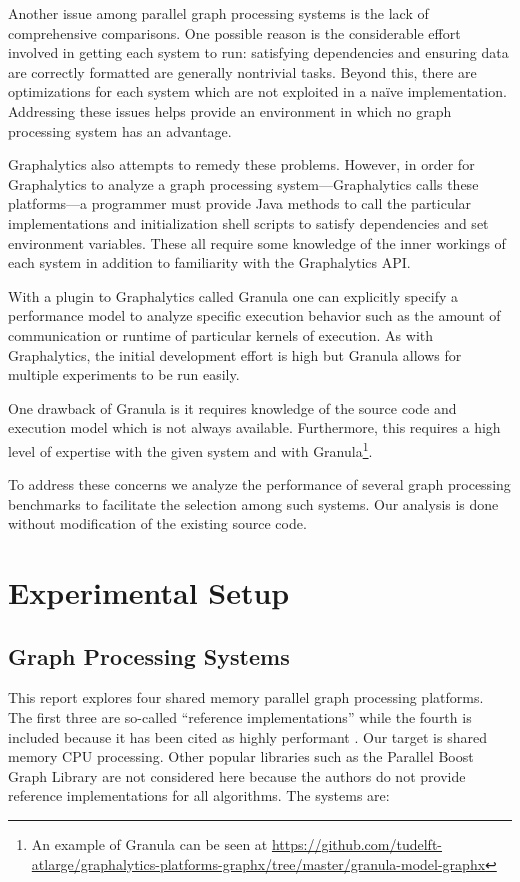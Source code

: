 \documentclass[conference]{IEEEtran}
\begin{document}
Another issue among parallel graph processing systems is the lack of comprehensive comparisons. One possible reason is the considerable effort involved in getting each system to run: satisfying dependencies and ensuring data are correctly formatted are generally nontrivial tasks. Beyond this, there are optimizations for each system which are not exploited in a na\"ive implementation. Addressing these issues helps provide an environment in which no graph processing system has an advantage.

Graphalytics \cite{Capota:2015:Graphalytics} also attempts to remedy these problems. However, in order for Graphalytics to analyze a graph processing system---Graphalytics calls these platforms---a programmer must provide Java methods to call the particular implementations and initialization shell scripts to satisfy dependencies and set environment variables. These all require some knowledge of the inner workings of each system in addition to familiarity with the Graphalytics API.

With a plugin to Graphalytics called Granula \cite{Ngai:2015:Granula} one can explicitly specify a performance model to analyze specific execution behavior such as the amount of communication or runtime of particular kernels of execution. As with Graphalytics, the initial development effort is high but Granula allows for multiple experiments to be run easily.

One drawback of Granula is it requires knowledge of the source code and execution model which is not always available. Furthermore, this requires a high level of expertise with the given system and with Granula\footnote{An example of Granula can be seen at \url{https://github.com/tudelft-atlarge/graphalytics-platforms-graphx/tree/master/granula-model-graphx}}.

To address these concerns we analyze the performance of several graph processing benchmarks to facilitate the selection among such systems. Our analysis is done without modification of the existing source code.

\section{Experimental Setup}

\subsection{Graph Processing Systems}

This report explores four shared memory parallel graph processing platforms. The first three are so-called ``reference implementations'' while the fourth is included because it has been cited as highly performant \cite{Sundaram:2015:GraphMat}. Our target is shared memory CPU processing. Other popular libraries such as the Parallel Boost Graph Library \cite{Gregor:2005:PBGL} are not considered here because the authors do not provide reference implementations for all algorithms. The systems are:
\end{document}
